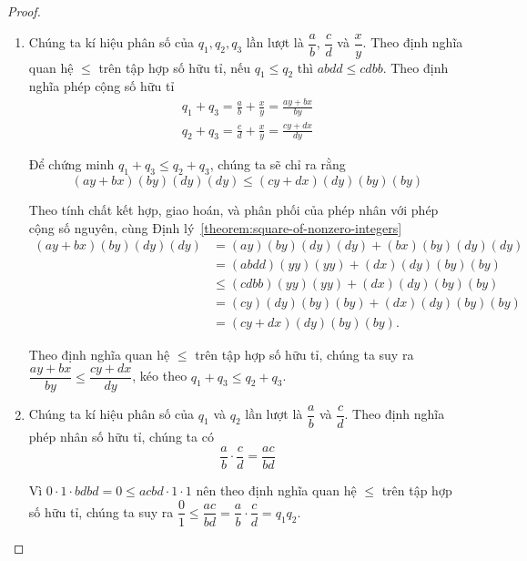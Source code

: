 \begin{proof}
    \begin{enumerate}[label={(\roman*)}]
        \item Chúng ta kí hiệu phân số của $q_{1}, q_{2}, q_{3}$ lần lượt là $\dfrac{a}{b}$, $\dfrac{c}{d}$ và $\dfrac{x}{y}$. Theo định nghĩa quan hệ $\leq$ trên tập hợp số hữu tỉ, nếu $q_{1}\leq q_{2}$ thì $abdd\leq cdbb$. Theo định nghĩa phép cộng số hữu tỉ
              \[
                  \begin{split}
                      q_{1} + q_{3} = \frac{a}{b} + \frac{x}{y} = \frac{ay + bx}{by} \\
                      q_{2} + q_{3} = \frac{c}{d} + \frac{x}{y} = \frac{cy + dx}{dy}
                  \end{split}
              \]

              Để chứng minh $q_{1} + q_{3}\leq q_{2} + q_{3}$, chúng ta sẽ chỉ ra rằng
              \[
                  (ay + bx)(by)(dy)(dy)\leq (cy + dx)(dy)(by)(by)
              \]

              Theo tính chất kết hợp, giao hoán, và phân phối của phép nhân với phép cộng số nguyên, cùng Định lý~\ref{theorem:square-of-nonzero-integers}
              \begin{align*}
                  (ay + bx)(by)(dy)(dy) & = (ay)(by)(dy)(dy) + (bx)(by)(dy)(dy)  \\
                                        & = (abdd)(yy)(yy) + (dx)(dy)(by)(by)    \\
                                        & \leq (cdbb)(yy)(yy) + (dx)(dy)(by)(by) \\
                                        & = (cy)(dy)(by)(by) + (dx)(dy)(by)(by)  \\
                                        & = (cy + dx)(dy)(by)(by).
              \end{align*}

              Theo định nghĩa quan hệ $\leq$ trên tập hợp số hữu tỉ, chúng ta suy ra $\dfrac{ay + bx}{by}\leq \dfrac{cy + dx}{dy}$, kéo theo $q_{1} + q_{3}\leq q_{2} + q_{3}$.
        \item Chúng ta kí hiệu phân số của $q_{1}$ và $q_{2}$ lần lượt là $\dfrac{a}{b}$ và $\dfrac{c}{d}$. Theo định nghĩa phép nhân số hữu tỉ, chúng ta có
              \[
                  \frac{a}{b}\cdot \frac{c}{d} = \frac{ac}{bd}
              \]

              Vì $0\cdot 1\cdot bdbd = 0 \leq acbd\cdot 1\cdot 1$ nên theo định nghĩa quan hệ $\leq$ trên tập hợp số hữu tỉ, chúng ta suy ra $\dfrac{0}{1}\leq \dfrac{ac}{bd} = \dfrac{a}{b}\cdot\dfrac{c}{d} = q_{1}q_{2}$.
    \end{enumerate}
\end{proof}

